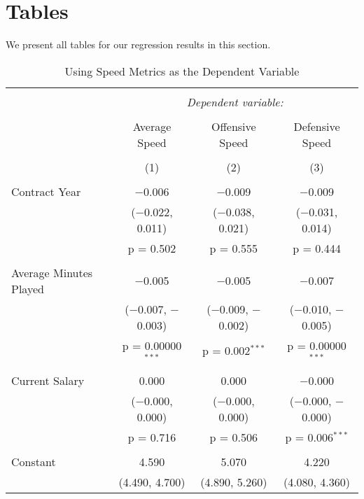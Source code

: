 \documentclass[12pt]{article}
\begin{document}
	\onehalfspacing
	
	\appendix
	
	\section{Tables} \label{sec:tab}
	
	We present all tables for our regression results in this section.
	
	\begin{sidewaystable}[!htbp] \centering 
		\caption{Using Speed Metrics as the Dependent Variable} 
		\label{} 
		\begin{tabular}{@{\extracolsep{5pt}}lccc} 
			\\[-1.8ex]\hline 
			\hline \\[-1.8ex] 
			& \multicolumn{3}{c}{\textit{Dependent variable:}} \\ 
			\cline{2-4} 
			\\[-1.8ex] & Average Speed & Offensive Speed & Defensive Speed \\ 
			\\[-1.8ex] & (1) & (2) & (3)\\ 
			\hline \\[-1.8ex] 
			Contract Year & $-$0.006 & $-$0.009 & $-$0.009 \\ 
			& ($-$0.022, 0.011) & ($-$0.038, 0.021) & ($-$0.031, 0.014) \\ 
			& p = 0.502 & p = 0.555 & p = 0.444 \\ 
			& & & \\ 
			Average Minutes Played & $-$0.005 & $-$0.005 & $-$0.007 \\ 
			& ($-$0.007, $-$0.003) & ($-$0.009, $-$0.002) & ($-$0.010, $-$0.005) \\ 
			& p = 0.00000$^{***}$ & p = 0.002$^{***}$ & p = 0.00000$^{***}$ \\ 
			& & & \\ 
			Current Salary & 0.000 & 0.000 & $-$0.000 \\ 
			& ($-$0.000, 0.000) & ($-$0.000, 0.000) & ($-$0.000, $-$0.000) \\ 
			& p = 0.716 & p = 0.506 & p = 0.006$^{***}$ \\ 
			& & & \\ 
			Constant & 4.590 & 5.070 & 4.220 \\ 
			& (4.490, 4.700) & (4.890, 5.260) & (4.080, 4.360) \\ 

\end{tabular}
\end{sidewaystable}
\end{document}

